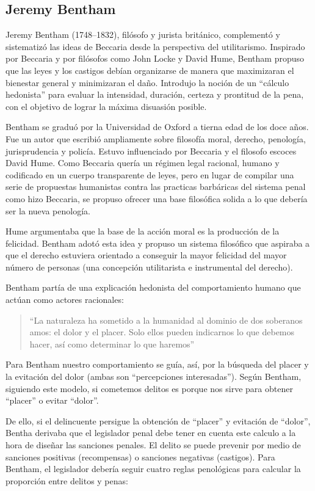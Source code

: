 \documentclass[
  spanish,
  letterpaper,
  DIV=11,
  numbers=noendperiod]{scrreprt}
\begin{document}
\subsection{Jeremy Bentham}\label{jeremy-bentham}

Jeremy Bentham (1748--1832), filósofo y jurista británico, complementó y
sistematizó las ideas de Beccaria desde la perspectiva del utilitarismo.
Inspirado por Beccaria y por filósofos como John Locke y David Hume,
Bentham propuso que las leyes y los castigos debían organizarse de
manera que maximizaran el bienestar general y minimizaran el daño.
Introdujo la noción de un ``cálculo hedonista'' para evaluar la
intensidad, duración, certeza y prontitud de la pena, con el objetivo de
lograr la máxima disuasión posible.

Bentham se graduó por la Universidad de Oxford a tierna edad de los doce
años. Fue un autor que escribió ampliamente sobre filosofía moral,
derecho, penología, jurisprudencia y policía. Estuvo influenciado por
Beccaria y el filosofo escoces David Hume. Como Beccaria quería un
régimen legal racional, humano y codificado en un cuerpo transparente de
leyes, pero en lugar de compilar una serie de propuestas humanistas
contra las practicas barbáricas del sistema penal como hizo Beccaria, se
propuso ofrecer una base filosófica solida a lo que debería ser la nueva
penología.

Hume argumentaba que la base de la acción moral es la producción de la
felicidad. Bentham adotó esta idea y propuso un sistema filosófico que
aspiraba a que el derecho estuviera orientado a conseguir la mayor
felicidad del mayor número de personas (una concepción utilitarista e
instrumental del derecho).

Bentham partía de una explicación hedonista del comportamiento humano
que actúan como actores racionales:

\begin{quote}
``La naturaleza ha sometido a la humanidad al dominio de dos soberanos
amos: el dolor y el placer. Solo ellos pueden indicarnos lo que debemos
hacer, así como determinar lo que haremos''
\end{quote}

Para Bentham nuestro comportamiento se guía, así, por la búsqueda del
placer y la evitación del dolor (ambas son ``percepciones
interesadas''). Según Bentham, siguiendo este modelo, si cometemos
delitos es porque nos sirve para obtener ``placer'' o evitar ``dolor''.

De ello, si el delincuente persigue la obtención de ``placer'' y
evitación de ``dolor'', Bentha derivaba que el legislador penal debe
tener en cuenta este calculo a la hora de diseñar las sanciones penales.
El delito se puede prevenir por medio de sanciones positivas
(recompensas) o sanciones negativas (castigos). Para Bentham, el
legislador debería seguir cuatro reglas penológicas para calcular la
proporción entre delitos y penas:
\end{document}

